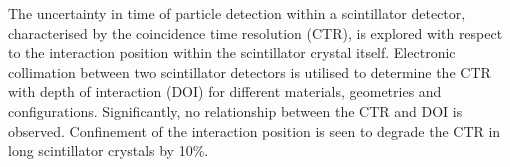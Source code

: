 The uncertainty in time of particle detection within a scintillator detector, characterised by the coincidence time resolution (CTR), is explored with respect to the interaction position within the scintillator crystal itself. Electronic collimation between two scintillator detectors is utilised to determine the CTR with depth of interaction (DOI) for different materials, geometries and configurations. Significantly, no relationship between the CTR and DOI is observed. Confinement of the interaction position is seen to degrade the CTR in long scintillator crystals by 10\%.